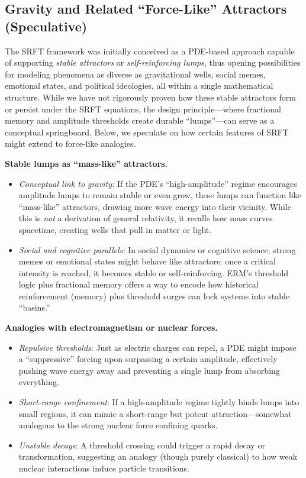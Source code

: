 \documentclass[12pt]{article}
\begin{document}
\subsection{Gravity and Related “Force-Like” Attractors (Speculative)}
\label{subsec:gravity_forces}

The SRFT framework was initially conceived as a PDE-based approach capable of 
supporting \emph{stable attractors} or \emph{self-reinforcing lumps}, thus 
opening possibilities for modeling phenomena as diverse as gravitational wells, 
social memes, emotional states, and political ideologies, all within a single 
mathematical structure. While we have not rigorously proven how these stable 
attractors form or persist under the SRFT equations, the design principle—where 
fractional memory and amplitude thresholds create durable “lumps”—can serve as 
a conceptual springboard. Below, we speculate on how certain features of SRFT might 
extend to force-like analogies.

\medskip

\noindent
\textbf{Stable lumps as “mass-like” attractors.}
\begin{itemize}
    \item \emph{Conceptual link to gravity:}
    If the PDE’s “high-amplitude” regime encourages amplitude lumps to remain 
    stable or even grow, these lumps can function like “mass-like” attractors, 
    drawing more wave energy into their vicinity. While this is \emph{not} a 
    derivation of general relativity, it recalls how mass curves spacetime, 
    creating wells that pull in matter or light.
    \item \emph{Social and cognitive parallels:}
    In social dynamics or cognitive science, strong memes or emotional states 
    might behave like attractors: once a critical intensity is reached, it 
    becomes stable or self‐reinforcing. ERM’s threshold logic plus fractional 
    memory offers a way to encode how historical reinforcement (memory) plus 
    threshold surges can lock systems into stable “basins.”
\end{itemize}

\medskip

\noindent
\textbf{Analogies with electromagnetism or nuclear forces.}
\begin{itemize}
    \item \emph{Repulsive thresholds}: 
    Just as electric charges can repel, a PDE might impose a “suppressive” 
    forcing upon surpassing a certain amplitude, effectively pushing wave 
    energy away and preventing a single lump from absorbing everything.
    \item \emph{Short-range confinement}: 
    If a high-amplitude regime tightly binds lumps into small regions, it 
    can mimic a short-range but potent attraction—somewhat analogous to the 
    strong nuclear force confining quarks. 
    \item \emph{Unstable decays}: 
    A threshold crossing could trigger a rapid decay or transformation, 
    suggesting an analogy (though purely classical) to how weak nuclear 
    interactions induce particle transitions.
\end{itemize}
\end{document}
